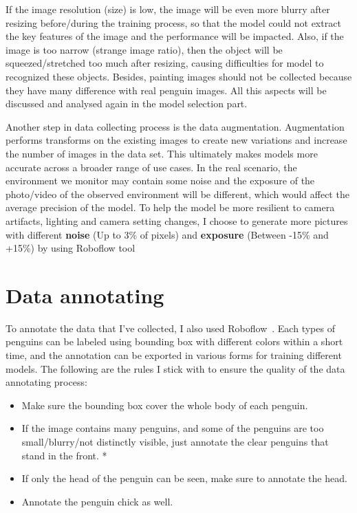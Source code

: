 \documentclass[runningheads]{llncs}
\begin{document}
If the image resolution (size) is low, the image will be even more blurry after resizing before/during the training process, so that the model could not extract the key features of the image and the performance will be impacted. Also, if the image is too narrow (strange image ratio), then the object will be squeezed/stretched too much after resizing, causing difficulties for model to recognized these objects. Besides, painting images should not be collected because they have many difference with real penguin images. All this aspects will be discussed and analysed again in the model selection part.

Another step in data collecting process is the data augmentation. Augmentation performs transforms on the existing images to create new variations and increase the number of images in the data set. This ultimately makes models more accurate across a broader range of use cases. 
In the real scenario, the environment we monitor may contain some noise and the exposure of the photo/video of the observed environment will be different, which would affect the average precision of the model. To help the model be more resilient to camera artifacts, lighting and camera setting changes, I choose to generate more pictures with different \textbf{noise} (Up to 3\% of pixels) and \textbf{exposure} (Between -15\% and +15\%) by using Roboflow tool~\cite{ref_roboflow}


\section{Data annotating}
To annotate the data that I've collected, I also used Roboflow~\cite{ref_roboflow}. Each types of penguins can be labeled using bounding box with different colors within a short time, and the annotation can be exported in various forms for training different models. The following are the rules I stick with to ensure the quality of the data annotating process:

\begin{itemize}
  \item Make sure the bounding box cover the whole body of each penguin.
  \item If the image contains many penguins, and some of the penguins are too small/blurry/not distinctly visible, just annotate the clear penguins that stand in the front. *
  \item If only the head of the penguin can be seen, make sure to annotate the head.
  \item Annotate the penguin chick as well.
\end{itemize}
\end{document}
